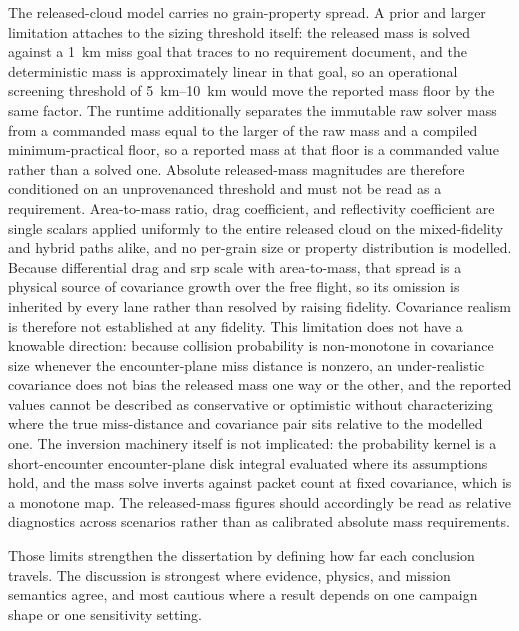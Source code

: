 The released-cloud model carries no grain-property spread. A prior and larger limitation attaches to the sizing threshold itself: the released mass is solved against a \SI{1}{\kilo\metre} miss goal that traces to no requirement document, and the deterministic mass is approximately linear in that goal, so an operational screening threshold of \SIrange{5}{10}{\kilo\metre} would move the reported mass floor by the same factor. The runtime additionally separates the immutable raw solver mass from a commanded mass equal to the larger of the raw mass and a compiled minimum-practical floor, so a reported mass at that floor is a commanded value rather than a solved one. Absolute released-mass magnitudes are therefore conditioned on an unprovenanced threshold and must not be read as a requirement. Area-to-mass ratio, drag coefficient, and reflectivity coefficient are single scalars applied uniformly to the entire released cloud on the mixed-fidelity and hybrid paths alike, and no per-grain size or property distribution is modelled. Because differential drag and \gls{srp} scale with area-to-mass, that spread is a physical source of covariance growth over the free flight, so its omission is inherited by every lane rather than resolved by raising fidelity. Covariance realism is therefore not established at any fidelity. This limitation does not have a knowable direction: because collision probability is non-monotone in covariance size whenever the encounter-plane miss distance is nonzero, an under-realistic covariance does not bias the released mass one way or the other, and the reported values cannot be described as conservative or optimistic without characterizing where the true miss-distance and covariance pair sits relative to the modelled one. The inversion machinery itself is not implicated: the probability kernel is a short-encounter encounter-plane disk integral evaluated where its assumptions hold, and the mass solve inverts against packet count at fixed covariance, which is a monotone map. The released-mass figures should accordingly be read as relative diagnostics across scenarios rather than as calibrated absolute mass requirements.

Those limits strengthen the dissertation by defining how far each conclusion travels. The discussion is strongest where evidence, physics, and mission semantics agree, and most cautious where a result depends on one campaign shape or one sensitivity setting.
